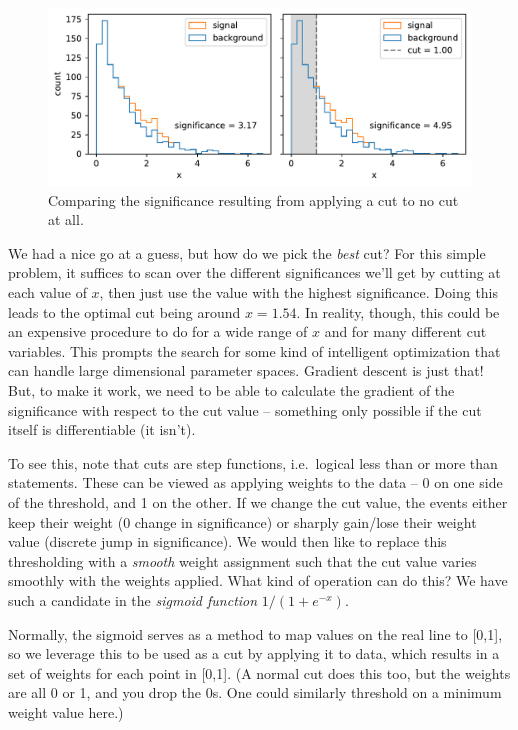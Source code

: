 \documentclass[
  11pt,
  numbers=noendperiod]{book}
\begin{document}
\begin{figure}

{\centering \includegraphics{./diffprog-hep_files/figure-pdf/fig-compare-cut-output-1.pdf}

}

\caption{\label{fig-compare-cut}Comparing the significance resulting
from applying a cut to no cut at all.}

\end{figure}

We had a nice go at a guess, but how do we pick the \emph{best} cut? For
this simple problem, it suffices to scan over the different
significances we'll get by cutting at each value of \(x\), then just use
the value with the highest significance. Doing this leads to the optimal
cut being around \(x=1.54\). In reality, though, this could be an
expensive procedure to do for a wide range of \(x\) and for many
different cut variables. This prompts the search for some kind of
intelligent optimization that can handle large dimensional parameter
spaces. Gradient descent is just that! But, to make it work, we need to
be able to calculate the gradient of the significance with respect to
the cut value -- something only possible if the cut itself is
differentiable (it isn't).

To see this, note that cuts are step functions, i.e.~logical less than
or more than statements. These can be viewed as applying weights to the
data -- 0 on one side of the threshold, and 1 on the other. If we change
the cut value, the events either keep their weight (0 change in
significance) or sharply gain/lose their weight value (discrete jump in
significance). We would then like to replace this thresholding with a
\emph{smooth} weight assignment such that the cut value varies smoothly
with the weights applied. What kind of operation can do this? We have
such a candidate in the \emph{sigmoid function} \(1/(1+e^{-x})\).

Normally, the sigmoid serves as a method to map values on the real line
to {[}0,1{]}, so we leverage this to be used as a cut by applying it to
data, which results in a set of weights for each point in {[}0,1{]}. (A
normal cut does this too, but the weights are all 0 or 1, and you drop
the 0s. One could similarly threshold on a minimum weight value here.)
\end{document}
